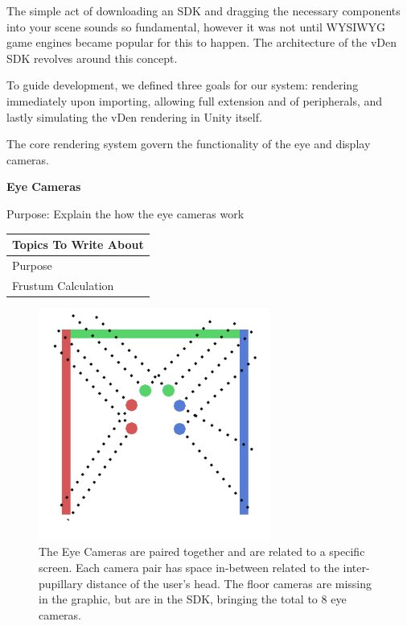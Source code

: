 The simple act of downloading an SDK and dragging the necessary components into your scene sounds so fundamental, however it was not until WYSIWYG game engines became popular for this to happen. The architecture of the vDen SDK revolves around this concept.

To guide development, we defined three goals for our system: rendering immediately upon importing, allowing full extension and of peripherals, and lastly simulating the vDen rendering in Unity itself.

The core rendering system govern the functionality of the eye and display cameras.

\noindent\textbf{Eye Cameras} \\
\begin{center}
	\textcolor{OliveGreen}{
		Purpose: Explain the how the eye cameras work
	}
	
	\begin{table}[H]
		\centering
		\renewcommand\arraystretch{0.5}
		\begin{tabular}{|l|}
			\hline 
			Topics To Write About \\ 
			\hline 
			Purpose \\
			Frustum Calculation \\
			\hline 
		\end{tabular}
	\end{table}
\end{center}

\begin{figure}[H]
	\centering
	\includegraphics[width=3in]{images/camera-pairs}
	\caption[The Pairing of Eye Cameras]{The Eye Cameras are paired together and are related to a specific screen. Each camera pair has space in-between related to the inter-pupillary distance of the user's head. The floor cameras are missing in the graphic, but are in the SDK, bringing the total to 8 eye cameras.}
	\label{fig:eye-camera-pairing}
\end{figure}

